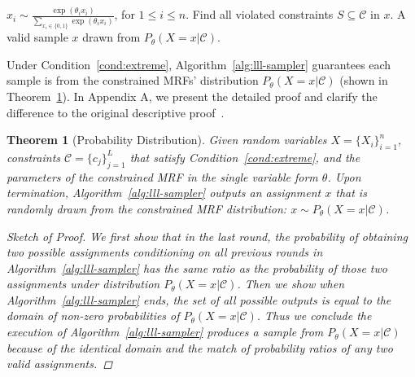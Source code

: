 \documentclass[letterpaper]{article} %
\newtheorem{theorem}{Theorem}
\newcommand{\var}{\mathtt{var}}
\begin{document}
\begin{algorithm}[t] 
	\caption{Sampling Through Lov\'asz Local Lemma.}\label{alg:lll-sampler}
	\begin{algorithmic}[1]
	\State $x_i\sim\frac{\exp(\theta_i x_i)}{\sum_{x_i\in \{0,1\}}\exp(\theta_ix_i)}$, for $1\le i\le n$. 
			\State Find all violated constraints $S\subseteq \mathcal{C}$ in $x$.
			\State {\small $x_k{\footnotesize \sim}\frac{\exp(\theta_k x_k)}{\underset{{x_k\in \{0,1\}}}{\sum}\exp(\theta_k x_k)}, \text{for } x_k \in \var(S)$.}
	\EndWhile
	\Return  A valid sample $x$ drawn from $P_{\theta}(X=x|\mathcal{C})$.
	\end{algorithmic}
\end{algorithm}

Under Condition~\ref{cond:extreme}, Algorithm~\ref{alg:lll-sampler} guarantees each sample is from the  constrained MRFs' distribution $P_\theta(X=x | \mathcal{C})$ (shown in Theorem~\ref{th:product-dist}). 
%
In Appendix A, we present the detailed proof and clarify the difference to the original descriptive proof~\cite{DBLP:journals/jacm/GuoJL19}.
\begin{theorem}[Probability Distribution] \label{th:product-dist}
Given  random variables $X=\{X_{i}\}_{i=1}^n$, constraints $\mathcal{C}=\{c_j\}_{j=1}^L$ that satisfy Condition~\ref{cond:extreme}, and the parameters of the constrained MRF in the single variable form  $\theta$. Upon termination, Algorithm~\ref{alg:lll-sampler}  outputs an assignment $x$ that is randomly drawn from the constrained MRF distribution: $x\sim P_\theta(X=x | \mathcal{C})$. 

\begin{proof}[Sketch of Proof] We first show that in the last round, the probability of obtaining two possible assignments conditioning on all previous rounds in Algorithm~\ref{alg:lll-sampler} has the same ratio as the probability of those two assignments under distribution $P_\theta(X=x | \mathcal{C})$. 
%
Then we show when {Algorithm~\ref{alg:lll-sampler}} ends, the set of all possible outputs is equal to the domain of non-zero probabilities of  $P_\theta(X=x | \mathcal{C})$.
%
Thus we conclude the execution of Algorithm~\ref{alg:lll-sampler} produces a sample from $P_{\theta}(X=x|\mathcal{C})$ because of the identical domain and the match of probability ratios of any two {valid} assignments. 
\end{proof}
\end{theorem}
\end{document}
